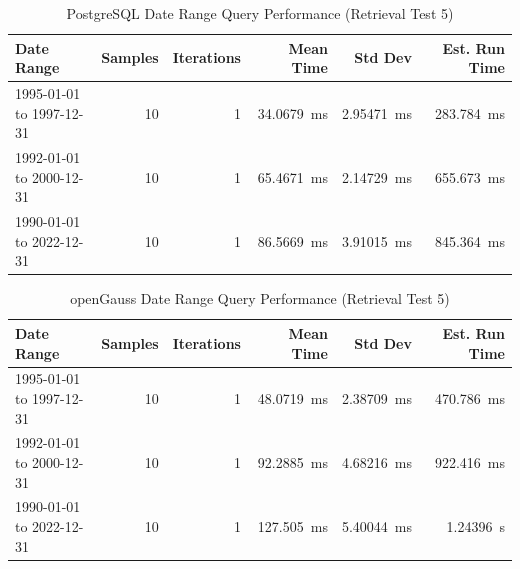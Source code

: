 \documentclass[14pt,a4paper]{article}
\begin{document}
    \begin{table}[H]
        \centering        
        \begin{tabular}{lrrrrr}
            \toprule
            \textbf{Date Range} & \textbf{Samples} & \textbf{Iterations} & \textbf{Mean Time} & \textbf{Std Dev} & \textbf{Est. Run Time} \\
            \midrule
            1995-01-01 to 1997-12-31 & 10 & 1 & \qty{34.0679}{\milli\second} & \qty{2.95471}{\milli\second} & \qty{283.784}{\milli\second} \\
            1992-01-01 to 2000-12-31 & 10 & 1 & \qty{65.4671}{\milli\second} & \qty{2.14729}{\milli\second} & \qty{655.673}{\milli\second} \\
            1990-01-01 to 2022-12-31 & 10 & 1 & \qty{86.5669}{\milli\second} & \qty{3.91015}{\milli\second} & \qty{845.364}{\milli\second} \\
            \bottomrule
        \end{tabular}
        \caption{PostgreSQL Date Range Query Performance (Retrieval Test 5)}
    \end{table}
    
    \begin{table}[H]
        \centering        
        \begin{tabular}{lrrrrr}
            \toprule
            \textbf{Date Range} & \textbf{Samples} & \textbf{Iterations} & \textbf{Mean Time} & \textbf{Std Dev} & \textbf{Est. Run Time} \\
            \midrule
            1995-01-01 to 1997-12-31 & 10 & 1 & \qty{48.0719}{\milli\second} & \qty{2.38709}{\milli\second} & \qty{470.786}{\milli\second} \\
            1992-01-01 to 2000-12-31 & 10 & 1 & \qty{92.2885}{\milli\second} & \qty{4.68216}{\milli\second} & \qty{922.416}{\milli\second} \\
            1990-01-01 to 2022-12-31 & 10 & 1 & \qty{127.505}{\milli\second} & \qty{5.40044}{\milli\second} & \qty{1.24396}{\second} \\
            \bottomrule
        \end{tabular}
        \caption{openGauss Date Range Query Performance (Retrieval Test 5)}
    \end{table}
    
\end{document}
